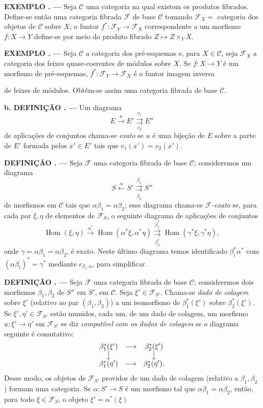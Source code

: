 \documentclass[11pt,twoside,openany]{book}
\numberwithin{equation}{section}
\newcommand{\src}[1]{%
  \phantomsection\hypertarget{src:#1}{}%
  \marginpar{\raggedleft\footnotesize\sffamily #1}%
}
\theoremstyle{plain}
\theoremstyle{definition}
\theoremstyle{remark}
\newcommand{\result}[2]{%
  \par\medskip\noindent\textbf{#1%
  \if\relax\detokenize{#2}\relax\else\space#2\fi. ---}\enspace
}
\newcommand{\FgaUnitKey}{frontmatter}
\renewcommand{\src}[1]{%
  \phantomsection\hypertarget{src:\FgaUnitKey:#1}{}%
  \marginpar{\raggedleft\footnotesize\sffamily #1}%
}
\begin{document}
\result{EXEMPLO}{1} Seja $\mathcal C$ uma categoria na qual existem os
produtos fibrados. Define-se então uma categoria fibrada $\mathcal F$ de
base $\mathcal C$ tomando $\mathcal F_X=$ categoria dos objetos de
$\mathcal C$ sobre $X$; o funtor
$f^*:\mathcal F_Y\longrightarrow\mathcal F_X$ correspondente a um morfismo
$f:X\longrightarrow Y$ define-se por meio do produto fibrado
$Z\longmapsto Z\times_YX$.

\result{EXEMPLO}{2} Seja $\mathcal C$ a categoria dos pré-esquemas e, para
$X\in\mathcal C$, seja $\mathcal F_X$ a categoria dos feixes
quase-coerentes de módulos sobre $X$. Se $f:X\longrightarrow Y$ é um morfismo
de pré-esquemas, $f^*:\mathcal F_Y\longrightarrow\mathcal F_X$ é o funtor
imagem inversa

\src{301}
de feixes de módulos. Obtém-se assim uma categoria fibrada de base
$\mathcal C$.

\result{b. DEFINIÇÃO}{1.2} Um diagrama
\[
  E\xrightarrow{u}E'
  \overset{v_1}{\underset{v_2}{\rightrightarrows}}E''
\]
de aplicações de conjuntos chama-se \emph{exato} se $u$ é uma bijeção de
$E$ sobre a parte de $E'$ formada pelos $x'\in E'$ tais que
$v_1(x')=v_2(x')$.

\result{DEFINIÇÃO}{1.3} Seja $\mathcal F$ uma categoria fibrada de base
$\mathcal C$; consideremos um diagrama
\[
  \tag{+}
  S\xleftarrow{\alpha}S'
  \overset{\beta_1}{\underset{\beta_2}{\rightrightarrows}}S''
\]
de morfismos em $\mathcal C$ tais que
$\alpha\beta_1=\alpha\beta_2$; esse diagrama chama-se
$\mathcal F$-\emph{exato} se, para cada par $\xi,\eta$ de elementos de
$\mathcal F_S$, o seguinte diagrama de aplicações de conjuntos
\[
  \tag{+'}
  \operatorname{Hom}(\xi,\eta)
  \xrightarrow{\alpha^*}
  \operatorname{Hom}(\alpha^*\xi,\alpha^*\eta)
  \overset{\beta_1^*}{\underset{\beta_2^*}{\rightrightarrows}}
  \operatorname{Hom}(\gamma^*\xi,\gamma^*\eta),
\]
onde $\gamma=\alpha\beta_1=\alpha\beta_2$, é exato. Neste último diagrama
temos identificado $\beta_i^*\alpha^*$ com
$(\alpha\beta_i)^*=\gamma^*$ mediante $c_{\beta_i,\alpha}$, para simplificar.

\result{DEFINIÇÃO}{1.4} Seja $\mathcal F$ uma categoria fibrada de base
$\mathcal C$; consideremos dois morfismos $\beta_1,\beta_2$ de $S''$ em $S'$,
em $\mathcal C$. Seja
$\xi'\in\mathcal F_{S'}$. Chama-se \emph{dado de colagem} sobre $\xi'$
(relativo ao par $(\beta_1,\beta_2)$) a um isomorfismo de
$\beta_1^*(\xi')$ sobre $\beta_2^*(\xi')$. Se $\xi',\eta'\in\mathcal F_{S'}$
estão munidos, cada um, de um dado de colagem, um morfismo
$u:\xi'\longrightarrow\eta'$ em $\mathcal F_{S'}$ se diz
\emph{compatível com os dados de colagem} se o diagrama seguinte é
comutativo:
\[
\begin{array}{ccc}
  \beta_1^*(\xi') & \longrightarrow & \beta_2^*(\xi') \\
  \big\downarrow && \big\downarrow \\
  \beta_1^*(\eta') & \longrightarrow & \beta_2^*(\eta').
\end{array}
\]
Desse modo, os objetos de $\mathcal F_{S'}$ providos de um dado de colagem
(relativo a $\beta_1,\beta_2$) formam uma categoria. Se
$\alpha:S'\longrightarrow S$ é um morfismo tal que
$\alpha\beta_1=\alpha\beta_2$, então, para todo $\xi\in\mathcal F_S$, o
objeto $\xi'=\alpha^*(\xi)$
\end{document}
